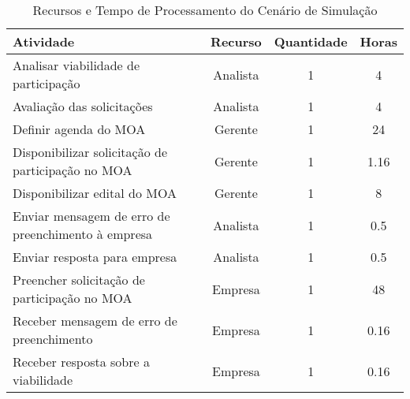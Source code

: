 \begin{table}[H]
	\centering
	\begin{tabular}{|p{5cm}|c|c|c|}
		\hline
		\textbf{Atividade} & \textbf{Recurso} & \textbf{Quantidade} & \textbf{Horas} \\ \hline
		Analisar viabilidade de participação & Analista & 1 & 4 \\ \hline
		Avaliação das solicitações & Analista & 1 & 4 \\ \hline
		Definir agenda do MOA & Gerente & 1 & 24 \\ \hline
		Disponibilizar solicitação de participação no MOA & Gerente & 1 & 1.16 \\ \hline
		Disponibilizar edital do MOA & Gerente & 1 & 8 \\ \hline
		Enviar mensagem de erro de preenchimento à empresa & Analista & 1 & 0.5 \\ \hline
		Enviar resposta para empresa & Analista & 1 & 0.5 \\ \hline
		Preencher solicitação de participação no MOA & Empresa & 1 & 48 \\ \hline
		Receber mensagem de erro de preenchimento & Empresa & 1 & 0.16 \\ \hline
		Receber resposta sobre a viabilidade & Empresa & 1 & 0.16 \\ \hline
	\end{tabular}
	\caption[Recursos e Tempo de Processamento do Cenário de Simulação]{Recursos e Tempo de Processamento do Cenário de Simulação}
\end{table}